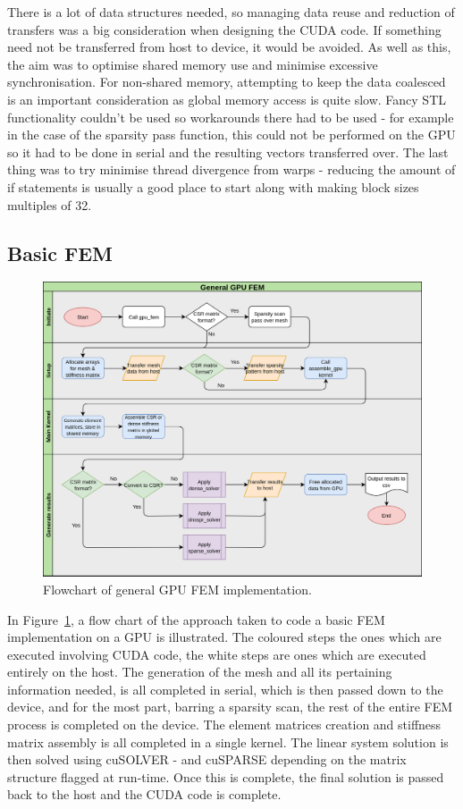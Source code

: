 There is a lot of data structures needed, so managing data reuse and reduction of transfers was a big consideration when designing the CUDA code. If something need not be transferred from host to device, it would be avoided. As well as this, the aim was to optimise shared memory use and minimise excessive synchronisation. For non-shared memory, attempting to keep the data coalesced is an important consideration as global memory access is quite slow. Fancy STL functionality couldn't be used so workarounds there had to be used - for example in the case of the sparsity pass function, this could not be performed on the GPU so it had to be done in serial and the resulting vectors transferred over. The last thing was to try minimise thread divergence from warps - reducing the amount of if statements is usually a good place to start along with making block sizes multiples of 32.

\subsection{Basic FEM}\label{basicfem}

\begin{figure}
	\centering
	\includegraphics[width = 0.9\linewidth]{Figures/gpu_flowchart}
	\caption{Flowchart of general GPU FEM implementation.}
	\label{fig:gpu_flow}
\end{figure}
In Figure~\ref{fig:gpu_flow}, a flow chart of the approach taken to code a basic FEM implementation on a GPU is illustrated. The coloured steps the ones which are executed involving CUDA code, the white steps are ones which are executed entirely on the host. The generation of the mesh and all its pertaining information needed, is all completed in serial, which is then passed down to the device, and for the most part, barring a sparsity scan, the rest of the entire FEM process is completed on the device. The element matrices creation and stiffness matrix assembly is all completed in a single kernel. The linear system solution is then solved using cuSOLVER - and cuSPARSE depending on the matrix structure flagged at run-time. Once this is complete, the final solution is passed back to the host and the CUDA code is complete.

